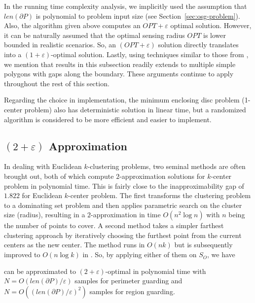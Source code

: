 \begin{remark}
In the running time complexity analysis, we implicitly 
used the assumption that $len(\partial P)$ is polynomial to problem input 
size (see Section~\ref{sec:osg-problem}). Also, the algorithm given above
computes an $OPT + \varepsilon$ optimal solution. However, 
it can be naturally assumed that the optimal
sensing radius $OPT$ is lower bounded in realistic scenarios. 
So, an $(OPT + \varepsilon)$ solution
directly translates into a $(1 + \varepsilon)$-optimal solution. 
Lastly, using techniques similar to those from \cite{fenghangaoyu2019efficient,fengyu2020RAL}, 
we mention that results in this subsection readily extends to multiple 
simple polygons with gaps along the boundary. 
These arguments continue to apply throughout the rest of  
this section. 
\end{remark}

Regarding the choice in implementation, the minimum enclosing disc problem 
(1-center problem) also has deterministic solution 
\cite{megiddo1983linear} in linear time, but a randomized algorithm is considered to be 
more efficient \cite{welzl1991smallest} and easier to implement.


\subsection{$(2 + \varepsilon)$ Approximation}
In dealing with Euclidean $k$-clustering problems, two seminal methods 
are often brought out, both of which compute $2$-approximation solutions
for $k$-center problem in polynomial time. This is fairly close to the 
inapproximability gap of $1.822$ for Euclidean $k$-center
problem\cite{feder1988optimal}. The first 
\cite{hochbaum1985best, vazirani2013approximation} transforms the 
clustering problem to a dominating set problem and then applies parametric 
search on the cluster size (radius), resulting in a $2$-approximation in 
time $O(n^2\log n)$ with $n$ being the number of points to cover. 
A second method \cite{gonzalez1985clustering} takes 
a simpler farthest clustering approach by iteratively choosing the 
furthest point from the current centers as the new center. The method runs 
in $O(nk)$ but is subsequently improved to $O(n\log k)$ in 
\cite{feder1988optimal}. So, by applying either of them on $S_O$, we have

\begin{proposition}
    \osgt can be approximated to $(2 +\varepsilon)$-optimal in polynomial time 
		with $N=O({len(\partial P)}/{\varepsilon})$ samples for perimeter 
		guarding and $N=O(({len(\partial P)}/{\varepsilon})^2)$ samples for
    region guarding.
\end{proposition}

